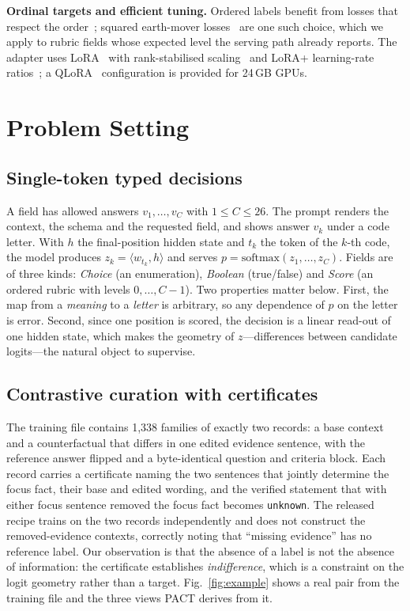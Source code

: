 \documentclass[conference]{IEEEtran}
\begin{document}
\textbf{Ordinal targets and efficient tuning.} Ordered labels benefit from
losses that respect the order~\cite{frank2001ordinal}; squared earth-mover
losses~\cite{hou2017emd} are one such choice, which we apply to rubric fields
whose expected level the serving path already reports. The adapter uses
LoRA~\cite{hu2022lora} with rank-stabilised scaling~\cite{kalajdzievski2023rslora}
and LoRA+ learning-rate ratios~\cite{hayou2024loraplus}; a
QLoRA~\cite{dettmers2023qlora} configuration is provided for 24\,GB GPUs.

\section{Problem Setting}
\label{sec:setting}

\subsection{Single-token typed decisions}
\label{sec:typed}
A field has allowed answers $v_1,\dots,v_C$ with $1\le C\le26$. The prompt
renders the context, the schema and the requested field, and shows answer
$v_k$ under a code letter. With $h$ the final-position hidden state and $t_k$
the token of the $k$-th code, the model produces $z_k=\langle w_{t_k},h\rangle$
and serves $p=\mathrm{softmax}(z_1,\dots,z_C)$. Fields are of three kinds:
\emph{Choice} (an enumeration), \emph{Boolean} (true/false) and \emph{Score}
(an ordered rubric with levels $0,\dots,C-1$). Two properties matter below.
First, the map from a \emph{meaning} to a \emph{letter} is arbitrary, so any
dependence of $p$ on the letter is error. Second, since one position is scored,
the decision is a linear read-out of one hidden state, which makes the
geometry of $z$---differences between candidate logits---the natural object to
supervise.

\subsection{Contrastive curation with certificates}
\label{sec:curation}
The training file contains 1{,}338 families of exactly two records: a base
context and a counterfactual that differs in one edited evidence sentence, with
the reference answer flipped and a byte-identical question and criteria block.
Each record carries a certificate naming the two sentences that jointly
determine the focus fact, their base and edited wording, and the verified
statement that with either focus sentence removed the focus fact becomes
\texttt{unknown}. The released recipe trains on the two records independently
and does not construct the removed-evidence contexts, correctly noting that
``missing evidence'' has no reference label. Our observation is that the
absence of a label is not the absence of information: the certificate
establishes \emph{indifference}, which is a constraint on the logit geometry
rather than a target. Fig.~\ref{fig:example} shows a real pair from the
training file and the three views PACT derives from it.
\end{document}
